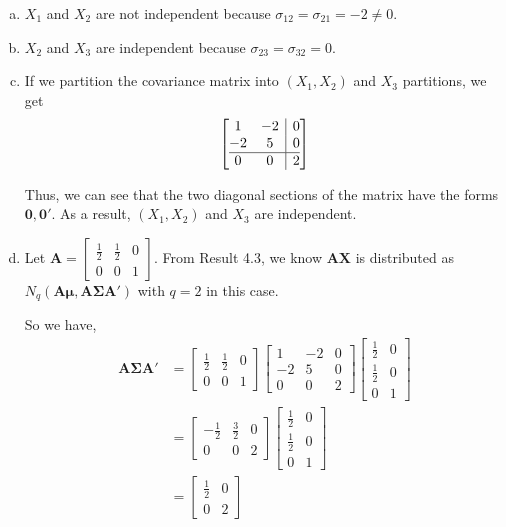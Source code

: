 \documentclass[12pt]{article}\usepackage[]{graphicx}\usepackage[]{color}
\newcommand{\vct}{\mathbf}
\begin{document}
\begin{enumerate}[a)]

\item $X_1$ and $X_2$ are not independent because $\sigma_{12} = \sigma_{21} = -2 \neq 0$.

\item $X_2$ and $X_3$ are independent because $\sigma_{23} = \sigma_{32} = 0$.

\item If we partition the covariance matrix into $(X_1, X_2)$ and $X_3$ partitions, we get
\begin{align*}
\left[\begin{array}{@{}cc|c@{}}
    1 & -2 & 0 \\
    -2 & 5 & 0 \\\hline
    0 & 0 & 2
  \end{array}\right]
\end{align*}

Thus, we can see that the two diagonal sections of the matrix have the forms $\vct{0}, \vct{0}'$. As a result, $(X_1, X_2)$ and $X_3$ are independent.

\item Let $\vct{A} = \begin{bmatrix} \frac{1}{2} & \frac{1}{2} & 0 \\ 0 & 0 & 1\end{bmatrix}$. From Result 4.3, we know $\vct{A}\vct{X}$ is distributed as $N_q(\vct{A}\vct{\mu}, \vct{A}\vct{\Sigma}\vct{A}')$ with $q = 2$ in this case.

So we have,
\begin{align*}
\vct{A}\vct{\Sigma}\vct{A}' &= \begin{bmatrix} \frac{1}{2} & \frac{1}{2} & 0 \\ 0 & 0 & 1\end{bmatrix} \begin{bmatrix} 1 & -2 & 0 \\ -2 & 5 & 0 \\ 0 & 0 & 2 \end{bmatrix} \begin{bmatrix} \frac{1}{2} & 0 \\ \frac{1}{2} & 0 \\ 0 & 1\end{bmatrix}\\
&= \begin{bmatrix} -\frac{1}{2} & \frac{3}{2} & 0 \\ 0 & 0 & 2\end{bmatrix} \begin{bmatrix} \frac{1}{2} & 0 \\ \frac{1}{2} & 0 \\ 0 & 1\end{bmatrix}\\
&= \begin{bmatrix} \frac{1}{2} & 0 \\ 0 & 2 \end{bmatrix}
\end{align*}


\end{enumerate}
\end{document}
